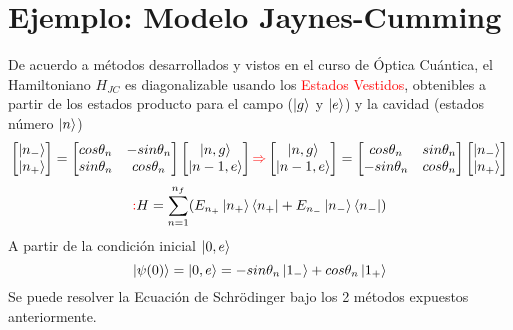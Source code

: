 \documentclass{book}
\begin{document}
\section{Ejemplo: Modelo Jaynes-Cumming}
De acuerdo a métodos desarrollados y vistos en el curso de Óptica Cuántica, el Hamiltoniano $H_{JC}$ es diagonalizable usando los \textcolor{red}{Estados Vestidos}, obtenibles a partir de los estados producto para el campo ($\ket{g}$ y $\ket{e}$) y la cavidad (estados número $\ket{n}$)
\begin{equation}\label{eq1.11}\begin{bmatrix}\ket{n_-}\\\ket{n_+}\end{bmatrix}=\begin{bmatrix}cos\theta_n & -sin \theta_n \\ sin\theta_n & cos\theta_n \end{bmatrix}\begin{bmatrix}\ket{n,g}\\\ket{n-1,e}\end{bmatrix}\textcolor{red}{\Rightarrow}\begin{bmatrix}\ket{n,g}\\\ket{n-1,e}\end{bmatrix}=\begin{bmatrix}cos\theta_n & sin \theta_n \\ -sin\theta_n & cos\theta_n \end{bmatrix}\begin{bmatrix}\ket{n_-}\\\ket{n_+}\end{bmatrix}\end{equation}
\begin{equation}\label{eq1.12}\textcolor{red}{:} H=\sum_{n=1}^{n_f} (E_{n_+}\ket{n_+}\bra{n_+}+E_{n_-}\ket{n_-}\bra{n_-})\end{equation}
A partir de la condición inicial $\ket{0,e}$
\begin{equation}\label{eq1.13}\ket{\psi(0)}=\ket{0,e}=-sin\theta_n\ket{1_-}+cos\theta_n\ket{1_+}\end{equation}
Se puede resolver la Ecuación de Schr\"odinger bajo los 2 métodos expuestos anteriormente.
\end{document}
